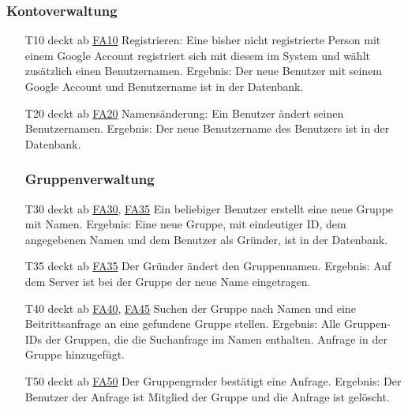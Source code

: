 \documentclass{scrartcl}
\begin{document}
\subsubsection{Kontoverwaltung}
\begin{itemize} 
	\item[T10] deckt ab \hyperlink{FA10}{FA10} \newline
	Registrieren: Eine bisher nicht registrierte Person mit einem Google Account registriert sich mit diesem im System 				und wählt zusätzlich einen Benutzernamen. \newline
	Ergebnis: Der neue Benutzer mit seinem Google Account und Benutzername ist in der Datenbank.
	
	\item[T20] deckt ab \hyperlink{FA20}{FA20}\newline
	Namensänderung: Ein Benutzer ändert seinen Benutzernamen. \newline
	Ergebnis: Der neue Benutzername des Benutzers ist in der Datenbank. 
	
	\subsubsection{Gruppenverwaltung}
	
	\item[T30] deckt ab \hyperlink{FA30}{FA30}, \hyperlink{FA35}{FA35}\newline
	Ein beliebiger Benutzer erstellt eine neue Gruppe mit Namen. \newline
	Ergebnis: Eine neue Gruppe, mit eindeutiger ID, dem angegebenen Namen und dem Benutzer als Gründer, ist in der 			Datenbank.
	
	\item[T35] deckt ab \hyperlink{FA35}{FA35} \newline
	Der Gründer ändert den Gruppennamen.\newline
	Ergebnis: Auf dem Server ist bei der Gruppe der neue Name eingetragen. 
	
	\item[T40] deckt ab \hyperlink{FA40}{FA40}, \hyperlink{FA45}{FA45}  \newline
	Suchen der Gruppe nach Namen und eine Beitrittsanfrage an eine gefundene Gruppe stellen. \newline
	Ergebnis: Alle Gruppen-IDs der Gruppen, die die Suchanfrage im Namen enthalten. Anfrage in der Gruppe 		
	hinzugefügt.
	
	\item[T50] deckt ab \hyperlink{FA50}{FA50}  \newline
	Der Gruppengrnder bestätigt eine Anfrage. \newline
	Ergebnis: Der Benutzer der Anfrage ist Mitglied der Gruppe und die Anfrage ist gelöscht.
	

\end{itemize}
\end{document}
